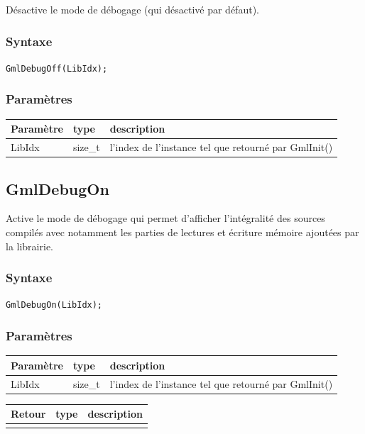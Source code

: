 \documentclass[a4paper,12pt]{article}
\begin{document}
Désactive le mode de débogage (qui désactivé par défaut).

\subsubsection*{Syntaxe}

{\tt GmlDebugOff(LibIdx);}
\subsubsection*{Paramètres}

\begin{tabular}{|m{2cm}|m{1.5cm}|m{10.5cm}|}
\hline
Paramètre  & type    & description \\
\hline
LibIdx     & size\_t & l'index de l'instance tel que retourné par GmlInit() \\
\hline
\end{tabular}


\subsection{GmlDebugOn}

Active le mode de débogage qui permet d'afficher l'intégralité des sources compilés avec notamment les parties de lectures et écriture mémoire ajoutées par la librairie.

\subsubsection*{Syntaxe}

{\tt GmlDebugOn(LibIdx);}

\subsubsection*{Paramètres}

\begin{tabular}{|m{2cm}|m{1.5cm}|m{10.5cm}|}
\hline
Paramètre  & type    & description \\
\hline
LibIdx     & size\_t & l'index de l'instance tel que retourné par GmlInit() \\
\hline
\end{tabular}

\medskip

\begin{tabular}{|m{2cm}|m{1.5cm}|m{10.5cm}|}
\hline
Retour     & type   & description \\
\hline
 & & \\
\hline
\end{tabular}
\end{document}
